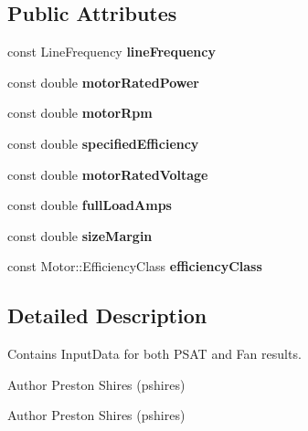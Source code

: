 \subsection*{Public Attributes}
\begin{DoxyCompactItemize}
\item 
\mbox{\label{struct_motor_a51e3b0191b70b167348f6d1fcf33dffa}} 
const Line\+Frequency {\bfseries line\+Frequency}
\item 
\mbox{\label{struct_motor_ac488edfbd918e91b2cf5581bae6a3d42}} 
const double {\bfseries motor\+Rated\+Power}
\item 
\mbox{\label{struct_motor_aa437c0e2db53bbc948794afb1081b059}} 
const double {\bfseries motor\+Rpm}
\item 
\mbox{\label{struct_motor_a1b202cba6ed0b1f13c5fe1b768148d5d}} 
const double {\bfseries specified\+Efficiency}
\item 
\mbox{\label{struct_motor_a7b7e315f3de114d48fce9d87606540f1}} 
const double {\bfseries motor\+Rated\+Voltage}
\item 
\mbox{\label{struct_motor_a7e11d5569d1ec3b3ecb2dfa6d5f19727}} 
const double {\bfseries full\+Load\+Amps}
\item 
\mbox{\label{struct_motor_a5d05eed62ab3c38056d72a706836d214}} 
const double {\bfseries size\+Margin}
\item 
\mbox{\label{struct_motor_a69eb3624f866ac1b27865ca494414c1c}} 
const Motor\+::\+Efficiency\+Class {\bfseries efficiency\+Class}
\end{DoxyCompactItemize}


\subsection{Detailed Description}
Contains Input\+Data for both P\+S\+AT and Fan results. 

\begin{DoxyAuthor}{Author}
Preston Shires (pshires) 
\end{DoxyAuthor}


\begin{DoxyAuthor}{Author}
Preston Shires (pshires) 
\end{DoxyAuthor}


